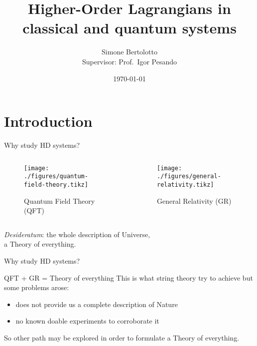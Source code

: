 \documentclass[10pt]{beamer}
\title{Higher-Order Lagrangians in classical and quantum systems}
\date{\today}
\author{Simone Bertolotto\\{\small Supervisor: Prof.\ Igor Pesando}}
\institute{Università degli studi di Torino --- Fisica}
\begin{document}
  \maketitle

  \section{Introduction}

  \begin{frame}{Why study HD systems?}
    \begin{columns}
      \begin{column}{0.5\textwidth}
        \begin{figure}
          \texttt{[image: ./figures/quantum-field-theory.tikz]}
          \caption[labelformat=empty]{Quantum Field Theory (QFT)}\label{fig:QFT}
        \end{figure}
      \end{column}
      \begin{column}{0.5\textwidth}
        \begin{figure}
          \texttt{[image: ./figures/general-relativity.tikz]}
          \caption[labelformat=empty]{General Relativity (GR)}\label{fig:GR}
        \end{figure}
      \end{column}
    \end{columns}
    \vspace{1em}
    \begin{center}
      \emph{Desideratum}: the whole description of Universe, \\
      a \alert{Theory of everything}.
    \end{center}
  \end{frame}

  \begin{frame}{Why study HD systems?}
    \begin{alertblock}{QFT + GR = Theory of everything}
        \vspace{0.5em}
        This is what string theory try to achieve but some problems arose:
        \begin{itemize}
          \item does not provide us a complete description of Nature
          \item no known doable experiments to corroborate it
        \end{itemize}
    \end{alertblock}
    So other path may be explored in order to formulate a Theory of everything.
  \end{frame}
\end{document}
